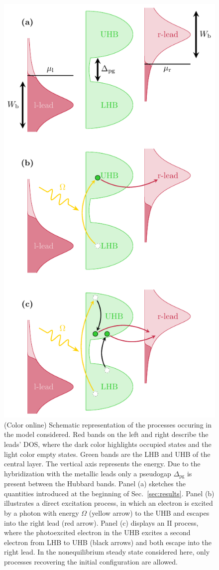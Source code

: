 \documentclass[aps,prb,groupedaddress,showpacs,twocolumn,superscriptaddress,10pt]{revtex4-2}
\begin{document}
\begin{figure}[t]    

\includegraphics[width=0.8\linewidth]{./figures_Paper1/energy_setup.pdf}
\caption{(Color online) Schematic representation of the processes occuring in the model considered. Red bands on the left and right describe the leads' DOS, where the dark color highlights occupied states and the light color empty states. Green bands are the LHB and UHB of the central layer. The vertical axis represents the energy. Due to the hybridization with the metallic leads only a pseudogap $\Delta_{\text{pg}}$ is present between the Hubbard bands. Panel (a) sketches the quantities introduced at the beginning of Sec.~\ref{sec:results}. Panel (b) illustrates a direct excitation process, in which an electron is excited by a photon with energy $\Omega$ (yellow arrow) to the UHB and escapes into the right lead (red arrow). Panel (c) displays an II process, where the photoexcited electron in the UHB excites a second electron from LHB to UHB (black arrows) and both escape into the right lead. In the nonequilibrium steady state considered here, only processes recovering the initial configuration are allowed.} 
\label{fig:energy_setup}
\end{figure}
  
\end{document}

